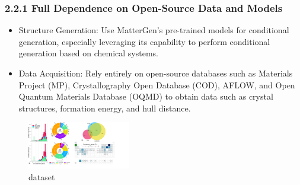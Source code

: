 \documentclass[letterpaper]{article} %
\begin{document}
\subsubsection{2.2.1 Full Dependence on Open-Source Data and Models}
\begin{itemize}
    \item Structure Generation: Use MatterGen's pre-trained models for conditional generation, especially leveraging its capability to perform conditional generation based on chemical systems.
    \item Data Acquisition: Rely entirely on open-source databases such as Materials Project (MP), Crystallography Open Database (COD), AFLOW, and Open Quantum Materials Database (OQMD) to obtain data such as crystal structures, formation energy, and hull distance.
\end{itemize}
\begin{figure}[htbp]  %
    \centering  %
    \includegraphics[width=0.4\textwidth]{1.png}  %
    \caption{dataset}  %
\end{figure}
\end{document}
